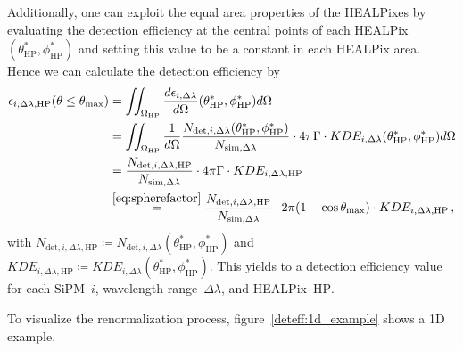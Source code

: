 Additionally, one can exploit the equal area properties of the HEALPixes by evaluating the detection efficiency at the central points of each HEALPix $(\theta^\ast_\text{HP},\phi^\ast_\text{HP})$ and setting this value to be a constant in each HEALPix area. Hence we can calculate the detection efficiency by
\begin{align}
	\epsilon_{i,\Delta\lambda,\text{HP}}(\theta\leq\theta_\text{max}) &= \iint_{\Omega_\text{HP}}  \frac{d\epsilon_{i,\Delta\lambda}}{d\Omega}(\theta^\ast_\text{HP},\phi^\ast_\text{HP}) d\Omega\nonumber\\
	&= \iint_{\Omega_\text{HP}}\frac{1}{d\Omega}\frac{N_{\text{det},i,\Delta\lambda}(\theta^\ast_\text{HP},\phi^\ast_\text{HP})}{N_{\text{sim},\Delta\lambda}}\cdot 4\pi\Gamma\cdot KDE_{i,\Delta\lambda}(\theta^\ast_\text{HP},\phi^\ast_\text{HP})d\Omega\nonumber\\
	&= \frac{N_{\text{det},i,\Delta\lambda,\text{HP}}}{N_{\text{sim},\Delta\lambda}}\cdot 4\pi\Gamma\cdot KDE_{i,\Delta\lambda,\text{HP}}\nonumber\\
	&\overset{\eqref{eq:spherefactor}}{=} \frac{N_{\text{det},i,\Delta\lambda,\text{HP}}}{N_{\text{sim},\Delta\lambda}}\cdot 2\pi(1-\cos\theta_\text{max})\cdot KDE_{i,\Delta\lambda,\text{HP}}\,,
	\label{eq:deteff}
\end{align}
with $N_{\text{det},i,\Delta\lambda,\text{HP}}\coloneqq N_{\text{det},i,\Delta\lambda}(\theta^\ast_\text{HP},\phi^\ast_\text{HP})$ and $KDE_{i,\Delta\lambda,\text{HP}}\coloneqq KDE_{i,\Delta\lambda}(\theta^\ast_\text{HP},\phi^\ast_\text{HP})$. This yields to a detection efficiency value for each SiPM~$i$, wavelength range~$\Delta\lambda$, and HEALPix~$\text{HP}$.

To visualize the renormalization process, figure~\ref{deteff:1d_example} shows a 1D example.

